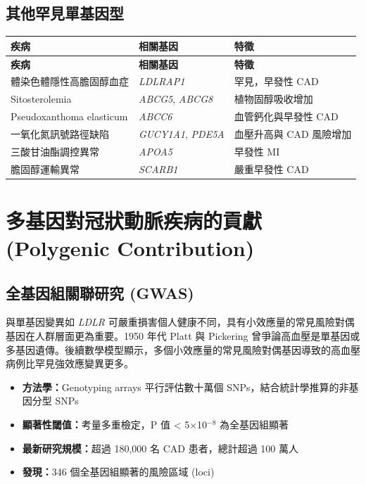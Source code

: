 \documentclass[12pt,a4paper]{article}
\begin{document}
\subsection{其他罕見單基因型}

\begin{longtable}{p{3.5cm}p{3cm}p{7cm}}
\toprule
\textbf{疾病} & \textbf{相關基因} & \textbf{特徵} \\
\midrule
\endfirsthead

\toprule
\textbf{疾病} & \textbf{相關基因} & \textbf{特徵} \\
\midrule
\endhead

\bottomrule
\endfoot

體染色體隱性高膽固醇血症 & \textit{LDLRAP1} & 罕見，早發性 CAD \\
\midrule
Sitosterolemia & \textit{ABCG5}, \textit{ABCG8} & 植物固醇吸收增加 \\
\midrule
Pseudoxanthoma elasticum & \textit{ABCC6} & 血管鈣化與早發性 CAD \\
\midrule
一氧化氮訊號路徑缺陷 & \textit{GUCY1A1}, \textit{PDE5A} & 血壓升高與 CAD 風險增加 \\
\midrule
三酸甘油酯調控異常 & \textit{APOA5} & 早發性 MI \\
\midrule
膽固醇運輸異常 & \textit{SCARB1} & 嚴重早發性 CAD \\
\bottomrule
\end{longtable}

\section{多基因對冠狀動脈疾病的貢獻 (Polygenic Contribution)}

\subsection{全基因組關聯研究 (GWAS)}

與單基因變異如 \textit{LDLR} 可嚴重損害個人健康不同，具有小效應量的常見風險對偶基因在人群層面更為重要。1950 年代 Platt 與 Pickering 曾爭論高血壓是單基因或多基因遺傳。後續數學模型顯示，多個小效應量的常見風險對偶基因導致的高血壓病例比罕見強效應變異更多。

\begin{itemize}
    \item \textbf{方法學：}Genotyping arrays 平行評估數十萬個 SNPs，結合統計學推算的非基因分型 SNPs
    \item \textbf{顯著性閾值：}考量多重檢定，P 值 < 5×10$^{-8}$ 為全基因組顯著
    \item \textbf{最新研究規模：}超過 180,000 名 CAD 患者，總計超過 100 萬人
    \item \textbf{發現：}346 個全基因組顯著的風險區域 (loci)
\end{itemize}
\end{document}
